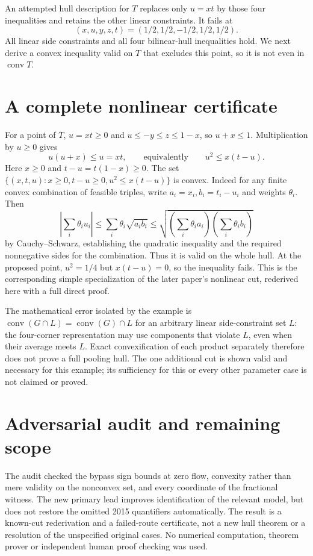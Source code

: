\documentclass[11pt]{article}
\begin{document}
An attempted hull description for $T$ replaces only $u=xt$ by those four
inequalities and retains the other linear constraints. It fails at
\[
(x,u,y,z,t)=(1/2,1/2,-1/2,1/2,1/2).
\]
All linear side constraints and all four bilinear-hull inequalities hold.
We next derive a convex inequality valid on $T$ that excludes this point,
so it is not even in $\operatorname{conv}T$.

\section{A complete nonlinear certificate}
For a point of $T$, $u=xt\ge0$ and
$u\le-y\le z\le1-x$, so $u+x\le1$.
Multiplication by $u\ge0$ gives
\[
u(u+x)\le u=xt,\qquad\text{equivalently}\qquad
u^2\le x(t-u).
\]
Here $x\ge0$ and $t-u=t(1-x)\ge0$. The set
$\{(x,t,u):x\ge0,t-u\ge0,u^2\le x(t-u)\}$ is convex.
Indeed for any finite convex combination of feasible triples, write
$a_i=x_i,b_i=t_i-u_i$ and weights $\theta_i$. Then
\[
\left|\sum_i\theta_i u_i\right|
\le\sum_i\theta_i\sqrt{a_i b_i}
\le\sqrt{\left(\sum_i\theta_i a_i\right)
\left(\sum_i\theta_i b_i\right)}
\]
by Cauchy--Schwarz, establishing the quadratic inequality and the required
nonnegative sides for the combination. Thus it is valid on the whole hull.
At the proposed point, $u^2=1/4$ but $x(t-u)=0$, so the inequality fails.
This is the corresponding simple specialization of the later paper's
nonlinear cut, rederived here with a full direct proof.

The mathematical error isolated by the example is
$\operatorname{conv}(G\cap L)=\operatorname{conv}(G)\cap L$ for an arbitrary
linear side-constraint set $L$: the four-corner representation may use
components that violate $L$, even when their average meets $L$.
Exact convexification of each product separately therefore does not prove a
full pooling hull. The one additional cut is shown valid and necessary for
this example; its sufficiency for this or every other parameter case is not
claimed or proved.

\section{Adversarial audit and remaining scope}
The audit checked the bypass sign bounds at zero flow, convexity rather than
mere validity on the nonconvex set, and every coordinate of the fractional
witness. The new primary lead improves identification of the relevant model,
but does not restore the omitted 2015 quantifiers automatically. The result
is a known-cut rederivation and a failed-route certificate, not a new hull
theorem or a resolution of the unspecified original cases. No numerical
computation, theorem prover or independent human proof checking was used.
\end{document}
